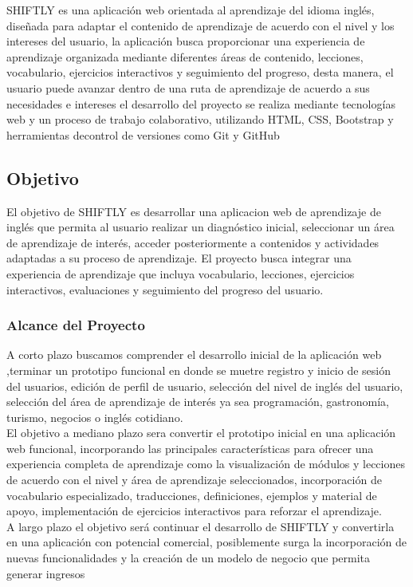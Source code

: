 SHIFTLY es una aplicación web orientada al aprendizaje del idioma inglés,
diseñada para adaptar el contenido de aprendizaje de acuerdo con el nivel
y los intereses del usuario, la aplicación busca proporcionar una experiencia de aprendizaje organizada mediante diferentes áreas de contenido, lecciones, vocabulario, ejercicios interactivos y seguimiento del progreso, desta manera, el usuario puede
avanzar dentro de una ruta de aprendizaje de acuerdo a sus necesidades e
intereses el desarrollo del proyecto se realiza mediante tecnologías web y un proceso
de trabajo colaborativo, utilizando HTML, CSS, Bootstrap y herramientas decontrol de versiones como Git y GitHub
\subsection{Objetivo}
El objetivo de SHIFTLY es desarrollar una aplicacion web de aprendizaje de inglés
que permita al usuario realizar un diagnóstico inicial, seleccionar un área
de aprendizaje de interés, acceder posteriormente a contenidos y
actividades adaptadas a su proceso de aprendizaje. El proyecto busca integrar una experiencia de aprendizaje que incluya vocabulario, lecciones, ejercicios interactivos, evaluaciones y seguimiento del progreso del usuario.
\subsubsection{Alcance del Proyecto}
A corto plazo buscamos comprender el desarrollo inicial de la aplicación web ,terminar un prototipo funcional en donde se muetre registro y inicio de sesión del usuarios, edición de perfil de usuario, selección del nivel de inglés del usuario, selección del área de aprendizaje de interés ya sea programación, gastronomía, turismo, negocios o inglés cotidiano.
\\{El objetivo a mediano plazo sera convertir el prototipo inicial en una aplicación web funcional, incorporando las principales características para ofrecer una experiencia completa de aprendizaje como la visualización de módulos y lecciones de acuerdo con el nivel y área de aprendizaje seleccionados, incorporación de vocabulario especializado, traducciones, definiciones, ejemplos y material de apoyo, implementación de ejercicios interactivos para reforzar el aprendizaje.}
\\{A largo plazo el objetivo será continuar el desarrollo de SHIFTLY y convertirla en una aplicación con potencial comercial, posiblemente surga la incorporación de nuevas funcionalidades y la creación de un modelo de negocio que permita generar ingresos}

